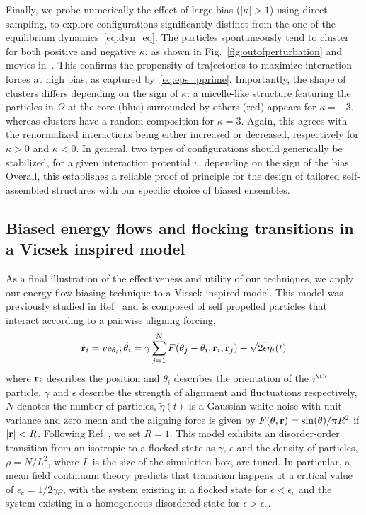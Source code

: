\documentclass[superscriptaddress, twocolumn, prx, longbibliography, nofootinbib]{revtex4-1}
\begin{document}
Finally, we probe numerically the effect of large bias ($|\kappa|>1$) using direct sampling, to explore configurations significantly distinct from the one of the equilibrium dynamics~\eqref{eq:dyn_eq}. The particles spontaneously tend to cluster for both positive and negative $\kappa$, as shown in Fig.~\ref{fig:outofperturbation} and movies in~\cite{movie}. This confirms the propensity of trajectories to maximize interaction forces at high bias, as captured by~\eqref{eq:eps_pprime}. Importantly, the shape of clusters differs depending on the sign of $\kappa$: a micelle-like structure featuring the particles in $\Omega$ at the core (blue) surrounded by others (red) appears for $\kappa=-3$, whereas clusters have a random composition for $\kappa=3$. Again, this agrees with the renormalized interactions being either increased or decreased, respectively for $\kappa>0$ and $\kappa<0$. In general, two types of configurations should generically be stabilized, for a given interaction potential $v$, depending on the sign of the bias. Overall, this establishes a reliable proof of principle for the design of tailored self-assembled structures with our specific choice of biased ensembles.


\subsection{{Biased energy flows and flocking transitions in a Vicsek inspired model}}
As a final illustration of the effectiveness and utility of our techniques, we apply our energy flow biasing technique to a Vicsek inspired model. This model was previously studied in Ref~\cite{Farell2012} and is composed of self propelled particles that interact according to a pairwise aligning forcing, 
\begin{equation}
    \label{eq:vicsek}
    \dot{{\bf r}}_i= v{\rm e}_{\theta_i};\dot{\theta_i}=\gamma \sum_{j=1}^{N} F(\theta_j-\theta_i,{\bf r}_i,{\bf r}_j)+\sqrt{2 \epsilon} \tilde \eta_i(t) 
\end{equation}
where ${\bf r}_i$ describes the position and $\theta_i$ describes the orientation of the $i^{\th}$ particle, $\gamma$ and $\epsilon$ describe the strength of alignment and fluctuations respectively, $N$ denotes the number of particles, $\tilde \eta(t)$ is a Gaussian white noise with unit variance and zero mean and the aligning force is given by $F(\theta,{\bf r})=\sin(\theta)/\pi R^2$ if $|{\bf r}|<R$. Following Ref~\cite{Farrell2012}, we set $R=1$. This model exhibits an disorder-order transition from an isotropic to a flocked state as $\gamma$, $\epsilon$ and the density of particles, $\rho=N/L^2$, where $L$ is the size of the simulation box, are tuned. In particular, a mean field continuum theory predicts that transition happens at a critical value of $\epsilon_c=1/2 \gamma \rho$, with the system existing in a flocked state for $\epsilon<\epsilon_c$ and the system existing in a homogeneous disordered state for $\epsilon>\epsilon_c$. 
\end{document}
